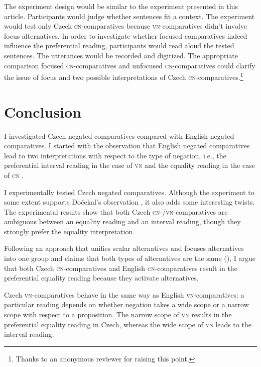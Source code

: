 \documentclass[output=paper,
]{langscibook}
\begin{document}
The experiment design would be similar to the experiment presented in this article. Participants would judge whether sentences fit a context. The experiment would test only Czech \textsc{cn-}comparatives because \textsc{vn-}comparatives didn't involve focus alternatives. In order to investigate whether focused comparatives indeed influence the preferential reading, participants would read aloud the tested sentences. The utterances would be recorded and digitized. The appropriate comparison focused \textsc{cn-}comparatives and unfocused \textsc{cn-}comparatives could clarify the issue of focus and two possible interpretations of Czech \textsc{cn-}comparatives.\footnote{Thanks to an anonymous reviewer for raising this point.} 


\section{Conclusion}
I investigated Czech negated comparatives compared with English negated comparatives. I started with the observation that English negated comparatives lead to two interpretations with respect to the type of negation, i.e., the preferential interval reading in the case of \textsc{vn} and the equality reading in the case of \textsc{cn} \citep{nouwen2008upper}. 

I experimentally tested Czech negated comparatives. Although the experiment to some extent supports Dočekal's observation \citep{dovcekal2017upper}, it also adds some interesting twists. The experimental results show that both Czech \textsc{cn-/vn-}compa\-ratives are ambiguous between an equality reading and an interval reading, though they strongly prefer the equality interpretation. 

Following an approach that unifies scalar alternatives and focuses alternatives into one group and claims that both types of alternatives are the same (\citealt{katzir2007structurally,fox2011characterization,fox2018economy}), I argue that both Czech \textsc{cn-}comparatives and English \textsc{cn-}comparatives result in the preferential equality reading because they activate alternatives.

Czech \textsc{vn-}comparatives behave in the same way as English \textsc{vn-}comparatives: a particular reading depends on whether negation takes a wide scope or a narrow scope with respect to a proposition. The narrow scope of \textsc{vn} results in the preferential equality reading in Czech, whereas the wide scope of \textsc{vn} leads to the interval reading. 
\end{document}
